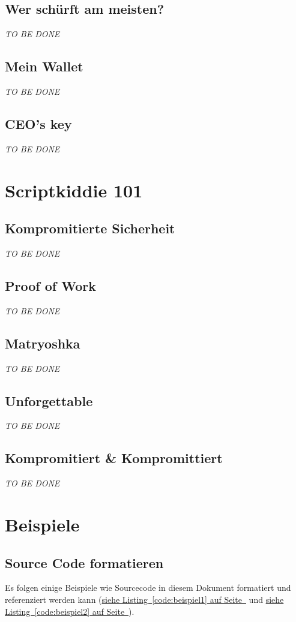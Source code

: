 \documentclass[12pt,a4paper,titlepage,oneside]{scrartcl}
\begin{document}
\pagebreak

\subsection{Wer schürft am meisten?}
\emph{TO BE DONE}

\subsection{Mein Wallet}
\emph{TO BE DONE}

\subsection{CEO's key}
\emph{TO BE DONE}

\section{Scriptkiddie 101}

\subsection{Kompromitierte Sicherheit}
\emph{TO BE DONE}

\subsection{Proof of Work}
\emph{TO BE DONE}

\subsection{Matryoshka}
\emph{TO BE DONE}

\subsection{Unforgettable}
\emph{TO BE DONE}

\subsection{Kompromitiert \& Kompromittiert}
\emph{TO BE DONE}

\section{Beispiele}

\subsection{Source Code formatieren}
Es folgen einige Beispiele wie Sourcecode in diesem Dokument formatiert und referenziert werden kann
(\hyperref[code:beispiel1]{siehe Listing~\ref*{code:beispiel1} auf Seite~\pageref*{code:beispiel1}} und \hyperref[code:beispiel2]{siehe Listing~\ref*{code:beispiel2} auf Seite~\pageref*{code:beispiel2}}).
\end{document}
